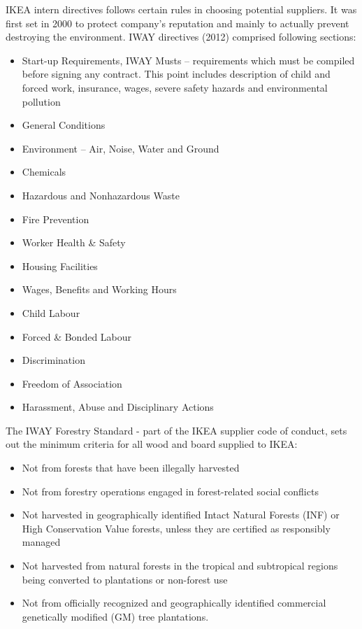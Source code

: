 \documentclass[oneside,12pt]{article}%
\begin{document}
IKEA intern directives follows certain rules in choosing potential suppliers. It was first set in 2000 to protect company’s reputation and mainly to actually prevent destroying the environment. IWAY directives (2012) comprised following sections:
\begin{itemize}
  \item Start-up Requirements, IWAY Musts – requirements which must be compiled before signing any contract. This point includes description of  child and forced work, insurance, wages, severe safety hazards and environmental pollution
  \item General Conditions
  \item Environment – Air, Noise, Water and Ground
  \item Chemicals
  \item Hazardous and Nonhazardous Waste
  \item Fire Prevention
  \item Worker Health & Safety
  \item Housing Facilities
  \item Wages, Benefits and Working Hours
  \item Child Labour
  \item Forced & Bonded Labour
  \item Discrimination
  \item Freedom of Association
  \item Harassment, Abuse and Disciplinary Actions
\end{itemize}


The IWAY Forestry Standard - part of the IKEA supplier code of conduct, sets out the minimum criteria for all wood and board supplied to IKEA:

\begin{itemize}
  \item Not from forests that have been illegally harvested
  \item Not from forestry operations engaged in forest-related social conflicts
  \item Not harvested in geographically identified Intact Natural Forests (INF) or High Conservation Value forests, unless they are certified as responsibly managed
  \item Not harvested from natural forests in the tropical and subtropical regions being converted to plantations or non-forest use
  \item Not from officially recognized and geographically identified commercial genetically modified (GM) tree plantations.
\end{itemize}
\end{document}
